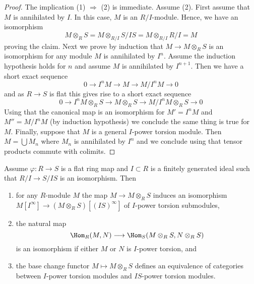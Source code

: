 \begin{proof}
The implication (1) $\Rightarrow$ (2) is immediate.
Assume (2). First assume that $M$ is annihilated by $I$.
In this case, $M$ is an $R/I$-module. Hence, we have an isomorphism
$$
M \otimes_R S = M \otimes_{R/I} S/IS = M \otimes_{R/I} R/I = M
$$
proving the claim. Next we prove by induction that $M \to M \otimes_R S$
is an isomorphism for any module $M$ is annihilated by $I^n$. Assume
the induction hypothesis holds for $n$ and assume $M$ is annihilated by
$I^{n + 1}$. Then we have a short exact sequence
$$
0 \to I^nM \to M \to M/I^nM \to 0
$$
and as $R \to S$ is flat this gives rise to a short exact sequence
$$
0 \to I^nM \otimes_R S \to M \otimes_R S \to M/I^nM \otimes_R S \to 0
$$
Using that the canonical map is an isomorphism for $M' = I^nM$ and
$M'' = M/I^nM$ (by induction hypothesis) we conclude the same thing is
true for $M$. Finally, suppose that $M$ is a general $I$-power torsion
module. Then $M = \bigcup M_n$ where $M_n$ is annihilated by $I^n$
and we conclude using that tensor products commute with colimits.
\end{proof}

\begin{lemma}
\label{lemma-neighbourhood-equivalence}
Assume $\varphi : R \to S$ is a flat ring map and $I \subset R$ is a
finitely generated ideal such that $R/I \to S/IS$ is an isomorphism. Then
\begin{enumerate}
\item for any $R$-module $M$ the map $M \to M \otimes_R S$ induces
an isomorphism
$M[I^\infty] \to (M \otimes_R S)[(IS)^\infty]$ of $I$-power
torsion submodules,
\item the natural map
$$
\Hom_R(M, N) \longrightarrow \Hom_S(M \otimes_R S, N \otimes_R S)
$$
is an isomorphism if either $M$ or $N$ is $I$-power torsion, and
\item the base change functor $M \mapsto M \otimes_R S$ defines an
equivalence of categories between $I$-power torsion modules
and $IS$-power torsion modules.
\end{enumerate}
\end{lemma}

